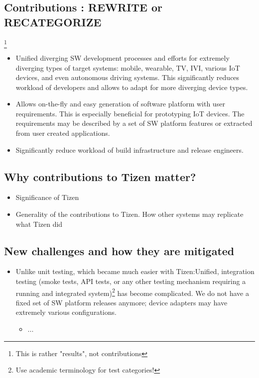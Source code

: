 \subsection{Contributions : REWRITE or RECATEGORIZE }\footnote{This is rather "results", not contributions}
\begin{itemize}
	\item Unified diverging SW development processes and efforts for extremely diverging types of target systems: mobile, wearable, TV, IVI, various IoT devices, and even autonomous driving systems. This significantly reduces workload of developers and allows to adapt for more diverging device types.
    \item Allows on-the-fly and easy generation of software platform with user requirements. This is especially beneficial for prototyping IoT devices. The requirements may be described by a set of SW platform features or extracted from user created applications.
    \item Significantly reduce workload of build infrastructure and release engineers.
\end{itemize}

\subsection{Why contributions to Tizen matter?}
\begin{itemize}
	\item Significance of Tizen
    \item Generality of the contributions to Tizen. How other systems may replicate what Tizen did
\end{itemize}

\subsection{New challenges and how they are mitigated}
\begin{itemize}
    \item Unlike unit testing, which became much easier with Tizen:Unified, integration testing (smoke tests, API tests, or any other testing mechanism requiring a running and integrated system)\footnote{Use academic terminology for test categories!} has become complicated. We do not have a fixed set of SW platform releases anymore; device adapters may have extremely various configurations.
    \begin{itemize}
        \item ...
    \end{itemize}
\end{itemize}

